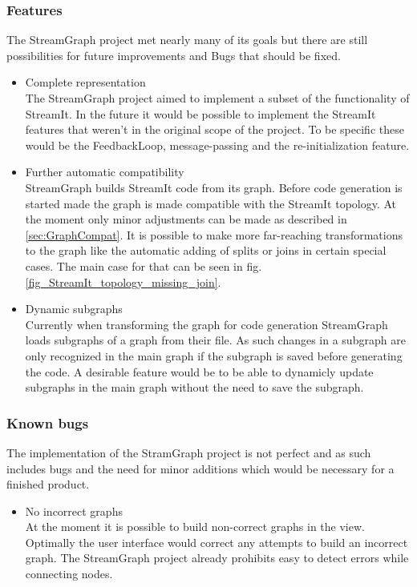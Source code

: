 \documentclass[journal]{IEEEtran}
\begin{document}
\subsubsection{Features}
The StreamGraph project met nearly many of its goals but there are still 
possibilities for future improvements and Bugs that should be fixed.
\begin{itemize}

\item Complete representation\\
The StreamGraph project aimed to implement a subset of the functionality
of StreamIt. In the future it would be possible to implement the StreamIt
features that weren't in the original scope of the project. To be specific these
would be the FeedbackLoop, message-passing and the re-initialization feature.\\

\item Further automatic compatibility\\
StreamGraph builds StreamIt code from its graph. Before code generation is
started made the graph is made compatible with the StreamIt topology. At the
moment only minor adjustments can be made as described in
\ref{sec:GraphCompat}. It is possible to make more far-reaching
transformations to the graph like the automatic adding of splits or joins in
certain special cases. The main case for that can be seen in fig.
\ref{fig_StreamIt_topology_missing_join}.

\item Dynamic subgraphs\\
Currently when transforming the graph for code generation
StreamGraph loads subgraphs of a graph from their file. As such 
changes in a subgraph are only recognized in the main graph if the subgraph
is saved before generating the code. A desirable feature would be to be able
to dynamicly update subgraphs in the main graph without the need to save the
subgraph.
\end{itemize}

\subsubsection{Known bugs}
The implementation of the StramGraph project is not perfect and as such includes
bugs and the need for minor additions which would be necessary for a finished product.
\begin{itemize}

\item No incorrect graphs\\
At the moment it is possible to build non-correct graphs in the view. Optimally the 
user interface would correct any attempts to build an incorrect graph. The StreamGraph 
project already prohibits easy to detect errors while connecting nodes.

\end{itemize}
\end{document}

